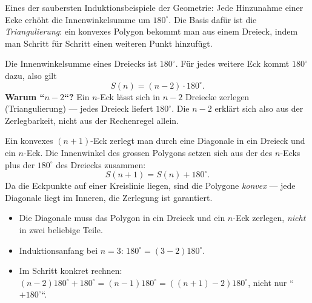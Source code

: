 


Eines der saubersten Induktionsbeispiele der Geometrie: Jede Hinzunahme
einer Ecke erhöht die Innenwinkelsumme um $180^\circ$. Die Basis dafür ist
die \emph{Triangulierung}: ein konvexes Polygon bekommt man aus einem
Dreieck, indem man Schritt für Schritt einen weiteren Punkt hinzufügt.

\begin{werkzeugkasten}
Die Innenwinkelsumme eines Dreiecks ist $180^\circ$. Für jedes weitere
Eck kommt $180^\circ$ dazu, also gilt
\begin{equation}
  S(n)=(n-2)\cdot180^\circ .
\end{equation}
\textbf{Warum ``$n-2$``?} Ein $n$-Eck lässt sich in $n-2$ Dreiecke
zerlegen (Triangulierung) --- jedes Dreieck liefert $180^\circ$. Die
$n-2$ erklärt sich also aus der Zerlegbarkeit, nicht aus der
Rechenregel allein.
\end{werkzeugkasten}

\begin{werkzeugkasten}
Ein konvexes $(n+1)$-Eck zerlegt man durch eine Diagonale in ein
Dreieck und ein $n$-Eck. Die Innenwinkel des grossen Polygons setzen sich
aus der des $n$-Ecks plus der $180^\circ$ des Dreiecks zusammen:
\begin{equation}
  S(n+1)=S(n)+180^\circ .
\end{equation}
Da die Eckpunkte auf einer Kreislinie liegen, sind die Polygone
\emph{konvex} --- jede Diagonale liegt im Inneren, die Zerlegung ist
garantiert.
\end{werkzeugkasten}

\begin{achtung}
\begin{itemize}
  \item Die Diagonale muss das Polygon in ein Dreieck und ein $n$-Eck
        zerlegen, \emph{nicht} in zwei beliebige Teile.
  \item Induktionsanfang bei $n=3$: $180^\circ=(3-2)180^\circ$.
  \item Im Schritt konkret rechnen:
        $(n-2)180^\circ+180^\circ=(n-1)180^\circ=((n+1)-2)180^\circ$,
        nicht nur ``$+180^\circ$``.
\end{itemize}
\end{achtung}
